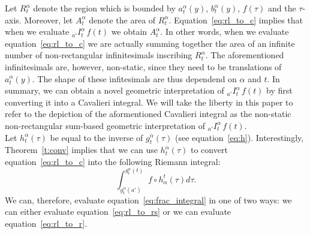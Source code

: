 \documentclass[twoside,reqno,11pt]{fcaa-var} %
\begin{document}
\noindent
Let $R_t^{\alpha}$ denote the region which is bounded by $a_t^{\alpha}(y)$, $b_t^{\alpha}(y)$, $f(\tau)$ and the $\tau$-axis. Moreover, let $A_{t}^{\alpha}$ denote the area of $R_t^{\alpha}$. Equation~\ref{eq:rl_to_c} implies that when we evaluate $_{a'}I_t^{\alpha}\,f(t)$ we obtain $A_{t}^{\alpha}$. In other words, when we evaluate equation~\eqref{eq:rl_to_c} we are actually summing together the area of an infinite number of non-rectangular infinitesimals inscribing $R_t^{\alpha}$. The aforementioned infinitesimals are, however, non-static, since they need to be translations of $a_t^{\alpha}(y)$. The shape of these infitesimals are thus dependend on $\alpha$ and $t$. In summary, we can obtain a novel geometric interpretation of 
$_{a'}I_t^{\alpha}\,f(t)$ by first converting it into a Cavalieri integral. We will take the liberty in this paper to refer to the depiction of the aformentioned Cavalieri integral as the non-static non-rectangular sum-based geometric interpretation of $_{a'}I_t^{\alpha}\,f(t)$.\\


\noindent
Let $h_t^{\alpha}(\tau)$ be equal to the inverse of $g_t^{\alpha}(\tau)$ (see equation~\eqref{eq:h}). Interestingly, Theorem~\ref{t:conv} implies that we can use $h_t^{\alpha}(\tau)$ to convert equation~\eqref{eq:rl_to_c} into the following Riemann integral:
\begin{equation}
\label{eq:rl_to_r}
\int_{g_t^{\alpha}(a')}^{g_t^{\alpha}(t)} f\circ h_{\alpha}^t (\tau) d\tau.  
\end{equation}
We can, therefore, evaluate equation~\eqref{eq:frac_integral} in one of two ways: we can either evaluate equation~\eqref{eq:rl_to_rs} or we can evaluate equation~\eqref{eq:rl_to_r}.
\end{document}
